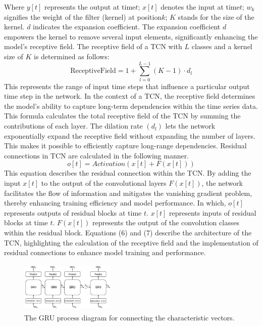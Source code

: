 \documentclass[sn-mathphys-num]{sn-jnl}%
\begin{document}
Where \(y [t]\) represents the output at time\(t\); \(x [t]\) denotes the input at time\(t\); \(w_k\) signifies the weight of the filter (kernel) at position\(k\); \(K\) stands for the size of the kernel. \(d\) indicates the expansion coefficient. 
The expansion coefficient \(d\) empowers the kernel to remove several input elements, significantly enhancing the model's receptive field. The receptive field of a TCN with \(L\) classes and a kernel size of \(K\) is determined as follows:
\begin{equation}
\text{ReceptiveField} = 1 + \sum_{l=0}^{L-1} (K - 1) \cdot d_l
\end{equation}
This represents the range of input time steps that influence a particular output time step in the network. In the context of a TCN, the receptive field determines the model’s ability to capture long-term dependencies within the time series data. This formula calculates the total receptive field of the TCN by summing the contributions of each layer. The dilation rate $(d_l)$ lets the network exponentially expand the receptive field without expanding the number of layers. This makes it possible to efficiently capture long-range dependencies. Residual connections in TCN are calculated in the following manner.
\begin{equation}
o[t] = Activation(x[t] + F(x[t]))    
\end{equation}
This equation describes the residual connection within the TCN. By adding the input \( x[t] \) to the output of the convolutional layers \( F(x[t]) \), the network facilitates the flow of information and mitigates the vanishing gradient problem, thereby enhancing training efficiency and model performance.
In which, \(o[t]\) represents outputs of residual blocks at time \(t\). \(x[t]\) represents inputs of residual blocks at time \(t\). \(F(x [t])\) represents the output of the convolution classes within the residual block. Equations (6) and (7) describe the architecture of the TCN, highlighting the calculation of the receptive field and the implementation of residual connections to enhance model training and performance. 

\begin{figure}[htbp]
  \centering
  \includegraphics[width=0.4\textwidth]{gru.jpg}
  \caption{ The GRU process diagram for connecting the characteristic vectors.}
  \label{fig:gru}
\end{figure}
\end{document}

